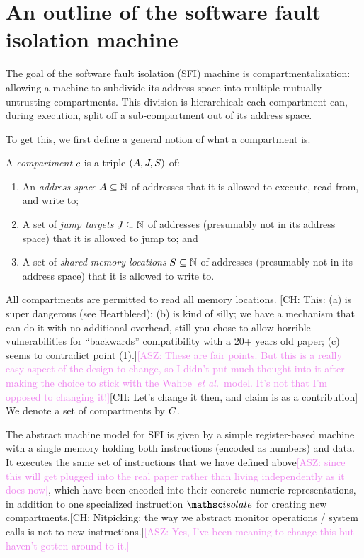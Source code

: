 \documentclass[12pt]{amsart}
\newif\ifdraft\drafttrue
\newcommand{\asz}[1]{\ifdraft\textcolor{violet}{[ASZ: #1]}\fi}
\newcommand*{\latin}[1]{\emph{#1}}
\newcommand*{\term}[1]{\emph{#1}}
\newcommand*{\N}{\mathbb{N}}
\newcommand{\comm}[3]{\ifdraft\textcolor{#1}{[#2: #3]}\fi}
\newcommand{\ch}[1]{\comm{dkgreen}{CH}{#1}} %
\begin{document}
\section{An outline of the software fault isolation machine}

The goal of the software fault isolation (SFI) machine is compartmentalization:
allowing a machine to subdivide its address space into multiple
mutually-untrusting compartments.  This division is hierarchical: each
compartment can, during execution, split off a sub-compartment out of its
address space.

To get this, we first define a general notion of what a compartment is.

\begin{definition}[Compartment]\label{def:compartment}
  A \term{compartment} $c$ is a triple
  $(A,J,S)$ of:
  \begin{enumerate}
  \item An \term{address space} $\AddressSpace \subseteq \N$ of addresses that
    it is allowed to execute, read from, and write to;
  \item A set of \term{jump targets} $\JumpTargets \subseteq \N$ of addresses
    (presumably not in its address space) that it is allowed to jump to; and
  \item A set of \term{shared memory locations} $\SharedMemory \subseteq \N$ of
    addresses (presumably not in its address space) that it is allowed to write
    to.
  \end{enumerate}
  All compartments are permitted to read all memory locations.
\ch{This: (a) is super dangerous (see Heartbleed);
%
  (b) is kind of silly; we have a mechanism that can do it with no
  additional overhead, still you chose to allow horrible
  vulnerabilities for ``backwards'' compatibility with a 20+ years old
  paper;
%
  (c) seems to contradict point (1).}\asz{These are fair points.  But this is a
  really easy aspect of the design to change, so I didn't put much thought into
  it after making the choice to stick with the Wahbe~\latin{et al.}\ model.
  It's not that I'm opposed to changing it!}\ch{Let's change it then, and claim
  is as a contribution}
  We denote a set of compartments by
$C$.
\end{definition}

The abstract machine model for SFI is given by a simple register-based machine
with a single memory holding both instructions (encoded as numbers) and data.
It executes the same set of instructions that we have defined above\asz{since
  this will get plugged into the real paper rather than living independently as
  it does now}, which have been encoded into their concrete numeric
representations, in addition to one specialized instruction $\opcode{isolate}$
for creating new compartments.\ch{Nitpicking: the way we abstract
  monitor operations / system calls is not to new instructions.}\asz{Yes, I've
  been meaning to change this but haven't gotten around to it.}
\end{document}
